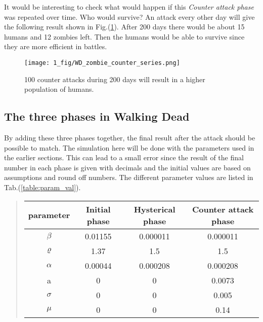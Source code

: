 \documentclass[%
twoside,                 %
final,                   %
chapterprefix=true,      %
open=right               %
10pt]{book}
\begin{document}
It would be interesting to check what would happen if this \emph{Counter attack phase} was repeated over time. Who would survive? An attack every other day will give the following result shown in Fig.(\ref{fig:counter_series}). After 200 days there would be about 15 humans and 12 zombies left. Then the humans would be able to survive since they are more efficient in battles. 


\begin{figure}[ht]
  \centerline{\texttt{[image: 1\_fig/WD\_zombie\_counter\_series.png]}}
  \caption{
  \label{fig:counter_series} 100 counter attacks during 200 days will result in a higher population of humans.
  }
\end{figure}


\subsection{The three phases in Walking Dead}
By adding these three phases together, the final result after the attack should be possible to match. The simulation here will be done with the parameters used in the earlier sections. This can lead to a small error since the result of the final number in each phase is given with decimals and the initial values are based on assumptions and round off numbers. The different parameter values are listed in Tab.(\ref{table:param_val}). 

\label{table:param_val}

\begin{quote}
\begin{tabular}{cccc}
\hline
\multicolumn{1}{c}{ parameter } & \multicolumn{1}{c}{ Initial phase } & \multicolumn{1}{c}{ Hysterical phase } & \multicolumn{1}{c}{ Counter attack phase } \\
\hline
$\beta$   & 0.01155       & 0.000011         & 0.000011             \\
$\varrho$ & 1.37          & 1.5              & 1.5                  \\
$\alpha$  & 0.00044       & 0.000208         & 0.000208             \\
a         & 0             & 0                & 0.0073               \\
$\sigma$  & 0             & 0                & 0.005                \\
$\mu$     & 0             & 0                & 0.14                 \\
\hline
\end{tabular}
\end{quote}
\end{document}
